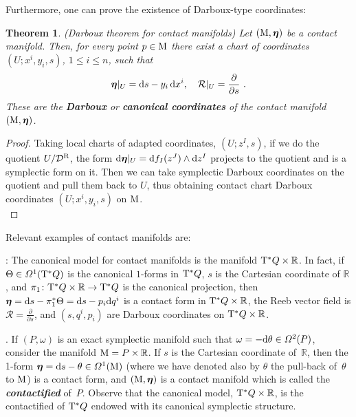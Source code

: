 \documentclass[12pt]{report}
\newtheorem{teor}{Theorem}[chapter]
\def\qed{\ifvmode\removelastskip\fi
{\unskip\nobreak\hfil\penalty50\hbox{}\nobreak\hfil
\hbox{\vrule height1.2ex width1.2ex}\parfillskip=0pt
\finalhyphendemerits=0 \par\smallskip}}
\def\df{{\mit\Omega}}
\def\d{{\rm d}}
\def\Real{\mathbb{R}}
\def\bmeta{\mbox{\boldmath $\eta$}}
\def\Tan{{\rm T}}
\newcommand{\Reeb}{\mathcal{R}}
\begin{document}
Furthermore, one can prove the existence of Darboux-type coordinates:

\begin{teor}
{\rm (Darboux theorem for contact manifolds)}
Let $({\rm M},\bmeta)$ be a contact manifold. 
Then, for every point $p\in {\rm M}$ there exist a chart of coordinates 
$(U; x^i, y_i, s)$, $1\leq i\leq n$, such that
\begin{equation*}
\bmeta\vert_U= \d s - y_i\,\d x^i 
,\quad
\Reeb\vert_U = \frac{\partial}{\partial s}\ .
\end{equation*}
These are the {\sl \textbf{Darboux}} or {\sl \textbf{canonical coordinates}} of the contact manifold $({\rm M},\bmeta)$.
\end{teor}
\begin{proof}
Taking local charts of adapted coordinates,
$(U;z^I,s)$, if we do the quotient $U/{\cal D}^{\rm R}$,
the form $\d\bmeta\vert_U=\d f_I(z^J)\wedge\d z^I$
projects to the quotient and is a symplectic form on it.
Then we can take symplectic Darboux coordinates on the quotient
and pull them back to $U$, thus obtaining contact chart Darboux coordinates $(U; x^i, y_i, s)$ on ${\rm M}$.
\\ \qed \end{proof}

Relevant examples of contact manifolds are:

:
The canonical model for contact manifolds
is the manifold $\Tan^*Q\times\Real$.
In fact, if $\Theta\in\df^1(\Tan^*Q)$ 
is the canonical $1$-forms in $\Tan^*Q$,
$s$ is the Cartesian coordinate of $\Real$, and 
$\pi_1\colon \Tan^*Q \times\Real \to \Tan^*Q$ 
is the canonical projection, then 
$\bmeta=\d s-\pi_1^*\Theta= \d s-p_i\d q^i$ is a contact form in  $\Tan^*Q\times\Real$,
the Reeb vector field is
$\displaystyle\Reeb=\frac{\partial}{\partial s}$, and $(s,q^i,p_i)$ are Darboux coordinates on $\Tan^*Q\times\Real$.

.
If $(P,\omega)$ is an exact symplectic manifold such that $\omega=-\d\theta\in\df^2(P)$,
consider the manifold ${\rm M} =P\times\Real$.
If $s$ is the Cartesian coordinate of~$\Real$,
then the 1-form
$\bmeta=\d s-\theta\in\df^1({\rm M})$
(where we have denoted also by $\theta$ the pull-back of~$\theta$ to ${\rm M}$) is a contact form,
and $({\rm M},\bmeta)$ is a contact manifold which is called the
{\sl\textbf{contactified}} of~$P$.
Observe that the canonical model, $\Tan^*Q\times\Real$,
is the contactified of $\Tan^*Q$ endowed with its canonical symplectic structure.
\end{document}
